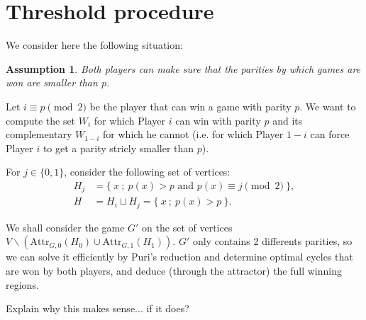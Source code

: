 \documentclass{article}
\newtheorem{assumption}{Assumption}
\newcommand{\attr}[2]{\mbox{Attr}_{#1}(#2)}
\begin{document}
\section{Threshold procedure}

We consider here the following situation:
\begin{assumption}
  \label{sp}
    Both players can make sure that the parities by which games are won are smaller than $p$.
\end{assumption}
  
Let $i \equiv p \pmod{2}$ be the player that can win a game with parity $p$.
We want to compute the set $W_i$ for which Player $i$ can win with parity $p$ and its complementary $W_{1-i}$ for which he cannot (i.e. for which Player $1-i$ can force Player $i$ to get a parity stricly smaller than $p$).

For $j \in \{0,1\}$, consider the following set of vertices:
\begin{align}
  H_j &= \{~ x ~;~ p(x)>p\mbox{ and }p(x) \equiv j \pmod{2} ~\}, \\
  H & = H_i \sqcup H_j = \{~ x ~;~ p(x)> p ~\}.
\end{align}

We shall consider the game $G'$ on the set of vertices $V \backslash ( \attr{G,0}{H_0} \cup \attr{G,1}{H_1} )$. $G'$ only contains 2 differents parities, so we can solve it efficiently by Puri's reduction and determine optimal cycles that are won by both players, and deduce (through the attractor) the full winning regions.

Explain why this makes sense... if it does?
\end{document}
